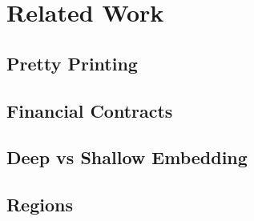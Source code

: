 \documentclass[11pt]{article}
\begin{document}
\section{Related Work}
\subsection{Pretty Printing}
\subsection{Financial Contracts}
\subsection{Deep vs Shallow Embedding}
\subsection{Regions}

\newpage
\end{document}
